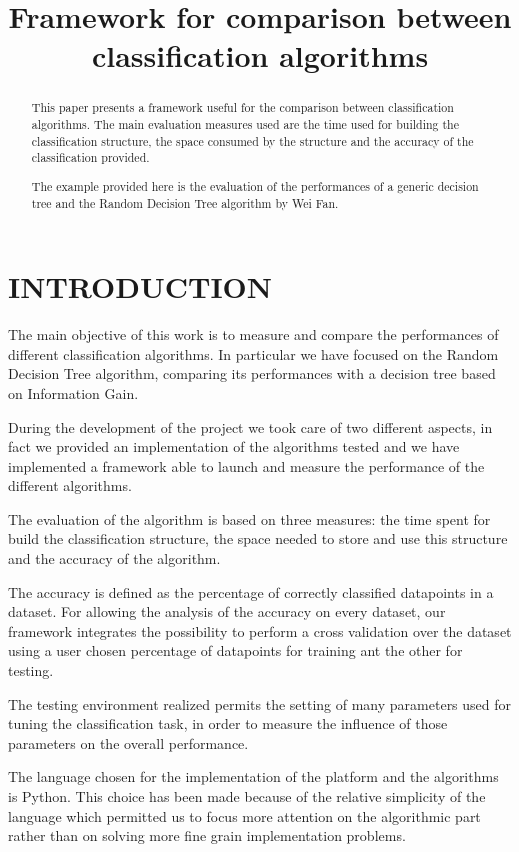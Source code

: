 \documentclass{acm_proc_article-sp-sigmod07}
\begin{document}
\title{Framework for comparison between classification algorithms}

\maketitle

\begin{abstract}
This paper presents a framework useful for the comparison between
classification algorithms.
The main evaluation measures used are the time used for building the
classification structure, the space consumed by the structure and the
accuracy of the classification provided.

The example provided here is the evaluation of the performances of a
generic decision tree and the Random Decision Tree algorithm by Wei Fan.
\end{abstract}

\section{INTRODUCTION}
The main objective of this work is to measure and compare the performances
of different classification algorithms. In particular we have focused on
the Random Decision Tree algorithm, comparing its performances with a
decision tree based on Information Gain.

During the development of the project we took care of two different
aspects, in fact we provided an implementation of the algorithms tested
and we have implemented a framework able to launch and measure the
performance of the different algorithms.

The evaluation of the algorithm is based on three measures: the time spent
for build the classification structure, the space needed to store and use
this structure and the accuracy of the algorithm.

The accuracy is defined as the percentage of correctly classified
datapoints in a dataset.
For allowing the analysis of the accuracy on every dataset, our framework
integrates the possibility to perform a cross validation over the dataset
using a user chosen percentage of datapoints for training ant the other
for testing.

The testing environment realized permits the setting of many parameters
used for tuning the classification task, in order to measure the influence
of those parameters on the overall performance.

The language chosen for the implementation of the platform and the
algorithms is Python. This choice has been made because of the relative
simplicity of the language which permitted us to focus more attention on
the algorithmic part rather than on solving more fine grain implementation
problems.
\end{document}

